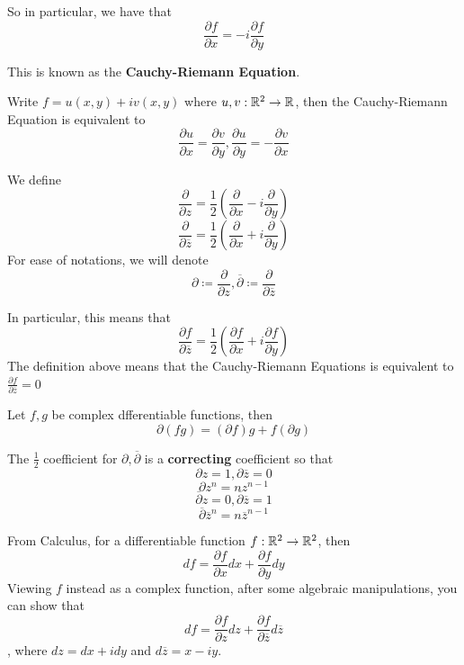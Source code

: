 \documentclass{article}
\begin{document}
So in particular, we have that
\[\frac{\partial f}{\partial x} = -i \frac{\partial f}{\partial y}\]

This is known as the \textbf{Cauchy-Riemann Equation}.

\begin{remark}
    Write $f = u(x, y) + i v(x, y)$ where $u, v: \mathbb{R}^2 \to \mathbb{R}$, then the Cauchy-Riemann Equation is equivalent to
    \[\frac{\partial u}{\partial x} = \frac{\partial v}{\partial y}, \frac{\partial u}{\partial y} = -\frac{\partial v}{\partial x}\]
\end{remark}

\begin{definition}
We define
\[\frac{\partial}{\partial z} = \frac{1}{2}(\frac{\partial}{\partial x} - i \frac{\partial}{\partial y})\]
\[\frac{\partial}{\partial \overline{z}} = \frac{1}{2}(\frac{\partial}{\partial x} + i \frac{\partial}{\partial y})\]
For ease of notations, we will denote
\[\partial \coloneqq \frac{\partial}{\partial z}, \overline{\partial} \coloneqq \frac{\partial}{\partial \overline{z}}\]
\end{definition}

\begin{remark}
In particular, this means that
\[\frac{\partial f}{\partial \overline{z}} = \frac{1}{2}(\frac{\partial f}{\partial x} + i \frac{\partial f}{\partial y})\]
    The definition above means that the Cauchy-Riemann Equations is equivalent to $\frac{\partial f}{\partial \overline{z}} = 0$
\end{remark}

\begin{proposition}
    Let $f, g$ be complex dfferentiable functions, then
    \[\partial(f g) = (\partial f) g + f (\partial g)\]
\end{proposition}

\begin{remark}
    The $\frac{1}{2}$ coefficient for $\partial, \overline{\partial}$ is a \textbf{correcting} coefficient so that
    \[\partial z = 1, \partial \overline{z} = 0\]
    \[\partial z^n = n z^{n-1}\]
    \[\overline{\partial} z = 0, \overline{\partial} \overline{z} = 1\]
    \[\overline{\partial} \overline{z}^n = n \overline{z}^{n-1}\]
\end{remark}

From Calculus, for a differentiable function $f: \mathbb{R}^2 \to \mathbb{R}^2$, then
\[df = \frac{\partial f}{\partial x} dx + \frac{\partial f}{\partial y} dy\]
Viewing $f$ instead as a complex function, after some algebraic manipulations, you can show that
\[df = \frac{\partial f}{\partial z} dz + \frac{\partial f}{\partial \overline{z}} d\overline{z}\]
, where $dz = dx + idy$ and $d\overline{z} = x - iy$.
\end{document}
